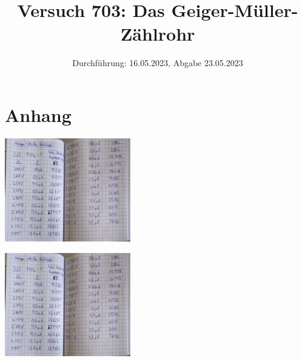 

\title{Versuch 703: Das Geiger-Müller-Zählrohr}
\date{Durchführung: 16.05.2023, Abgabe 23.05.2023}


\maketitle
\thispagestyle{empty} 
\tableofcontents
\newpage
\setcounter{page}{1}






\printbibliography
\newpage

\section*{Anhang}

\begin{minipage}[t]{0.4\textwidth}
   \includegraphics[height=4.5cm, page=1]{Abbildungen/v703_messdaten.pdf}
\end{minipage}
\begin{minipage}[t]{0.4\textwidth}
   \includegraphics[height=4.5cm, keepaspectratio, page=2]{Abbildungen/v703_messdaten.pdf}
\end{minipage}

